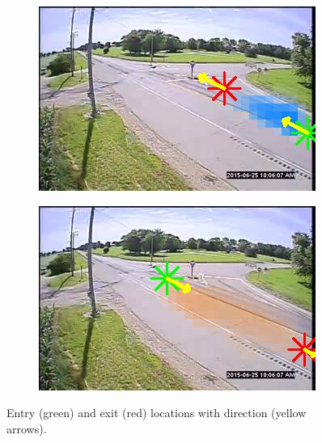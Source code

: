 \begin{figure}
    \centering
        \begin{subfigure}{0.32\linewidth}
            \includegraphics[width=\linewidth]{./img/scene_learning/res/243948/243948-0.jpg}
        \end{subfigure}
        \begin{subfigure}{0.32\linewidth}
            \includegraphics[width=\linewidth]{./img/scene_learning/res/243948/243948-1.jpg}
        \end{subfigure}
        \caption{Entry (green) and exit (red) locations with direction (yellow arrows).}
        \label{fig:entry-exit-app-5}
\end{figure}
